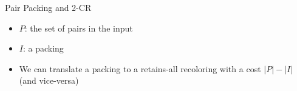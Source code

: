 \begin{frame}{Pair Packing and 2-CR}

\begin{itemize}
\boldmath
\item 
$P$: the set of pairs in the input

\pause\item
$I$: a packing

\pause\item 
We can translate a packing to a retains-all recoloring with a cost 
$|P| - |I|$ (and vice-versa) 

\end{itemize}

\end{frame}
